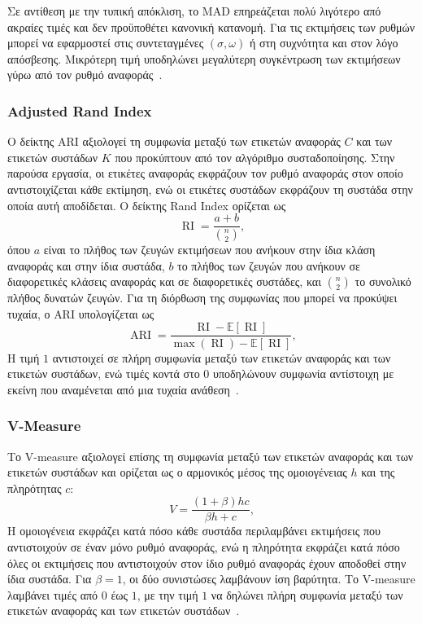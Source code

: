 Σε αντίθεση με την τυπική απόκλιση, το MAD επηρεάζεται πολύ λιγότερο από ακραίες τιμές και δεν προϋποθέτει κανονική κατανομή. Για τις εκτιμήσεις των ρυθμών μπορεί να εφαρμοστεί στις συντεταγμένες $(\sigma,\omega)$ ή στη συχνότητα και στον λόγο απόσβεσης. Μικρότερη τιμή υποδηλώνει μεγαλύτερη συγκέντρωση των εκτιμήσεων γύρω από τον ρυθμό αναφοράς~\cite{modal2018}.

\subsubsection{Adjusted Rand Index}

Ο δείκτης \textenglish{ARI} αξιολογεί τη συμφωνία μεταξύ των ετικετών αναφοράς $C$ και των ετικετών συστάδων $K$ που προκύπτουν από τον αλγόριθμο συσταδοποίησης. Στην παρούσα εργασία, οι ετικέτες αναφοράς εκφράζουν τον ρυθμό αναφοράς στον οποίο αντιστοιχίζεται κάθε εκτίμηση, ενώ οι ετικέτες συστάδων εκφράζουν τη συστάδα στην οποία αυτή αποδίδεται. Ο δείκτης \textenglish{Rand Index} ορίζεται ως
\begin{equation}
\operatorname{RI}=\frac{a+b}{\binom{n}{2}},
\label{eq:ri}
\end{equation}
όπου $a$ είναι το πλήθος των ζευγών εκτιμήσεων που ανήκουν στην ίδια κλάση αναφοράς και στην ίδια συστάδα, $b$ το πλήθος των ζευγών που ανήκουν σε διαφορετικές κλάσεις αναφοράς και σε διαφορετικές συστάδες, και $\binom{n}{2}$ το συνολικό πλήθος δυνατών ζευγών. Για τη διόρθωση της συμφωνίας που μπορεί να προκύψει τυχαία, ο \textenglish{ARI} υπολογίζεται ως
\begin{equation}
\operatorname{ARI}=\frac{\operatorname{RI}-\mathbb{E}[\operatorname{RI}]}{\max(\operatorname{RI})-\mathbb{E}[\operatorname{RI}]},
\label{eq:ari}
\end{equation}
Η τιμή $1$ αντιστοιχεί σε πλήρη συμφωνία μεταξύ των ετικετών αναφοράς και των ετικετών συστάδων, ενώ τιμές κοντά στο $0$ υποδηλώνουν συμφωνία αντίστοιχη με εκείνη που αναμένεται από μια τυχαία ανάθεση~\cite{etezadifar2023nilm,hubert1985comparing}.

\subsubsection{V-Measure}

Το \textenglish{V-measure} αξιολογεί επίσης τη συμφωνία μεταξύ των ετικετών αναφοράς και των ετικετών συστάδων και ορίζεται ως ο αρμονικός μέσος της ομοιογένειας $h$ και της πληρότητας $c$:
\begin{equation}
V=\frac{(1+\beta)hc}{\beta h+c},
\label{eq:v-measure}
\end{equation}
Η ομοιογένεια εκφράζει κατά πόσο κάθε συστάδα περιλαμβάνει εκτιμήσεις που αντιστοιχούν σε έναν μόνο ρυθμό αναφοράς, ενώ η πληρότητα εκφράζει κατά πόσο όλες οι εκτιμήσεις που αντιστοιχούν στον ίδιο ρυθμό αναφοράς έχουν αποδοθεί στην ίδια συστάδα. Για $\beta=1$, οι δύο συνιστώσες λαμβάνουν ίση βαρύτητα. Το \textenglish{V-measure} λαμβάνει τιμές από $0$ έως $1$, με την τιμή $1$ να δηλώνει πλήρη συμφωνία μεταξύ των ετικετών αναφοράς και των ετικετών συστάδων~\cite{etezadifar2023nilm,rosenberg2007vmeasure}.

